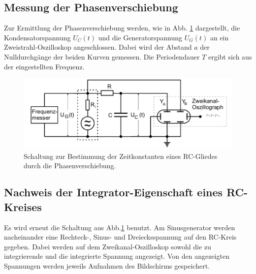 \subsection{Messung der Phasenverschiebung}
Zur Ermittlung der Phasenverschiebung werden, wie in Abb. \ref{fig:4c} dargestellt, die Kondensatorspannung $U_{C}(t)$ 
und die Generatorspannung $U_{G}(t)$ an ein Zweistrahl-Oszilloskop angeschlossen. Dabei wird der Abstand $a$ der 
Nulldurchgänge der beiden Kurven gemessen. Die Periodendauer $T$ ergibt sich aus der eingestellten Frequenz.%
\begin{figure}
  \centering
  \includegraphics{build/4c.png}
  \caption{Schaltung zur Bestimmung der Zeitkonstanten eines RC-Gliedes durch die Phasenverschiebung.}
  \label{fig:4c}
\end{figure}

\subsection{Nachweis der Integrator-Eigenschaft eines RC-Kreises}
Es wird erneut die Schaltung aus Abb.\ref{fig:4c} benutzt. Am Sinusgenerator werden nacheinander eine Rechteck-, 
Sinus- und Dreiecksspannung auf den RC-Kreis gegeben. Dabei werden auf dem Zweikanal-Oszilloskop sowohl die 
zu integrierende und die integrierte Spannung angezeigt. Von den angezeigten Spannungen werden jeweils Aufnahmen
des Bildschirms gespeichert. 
